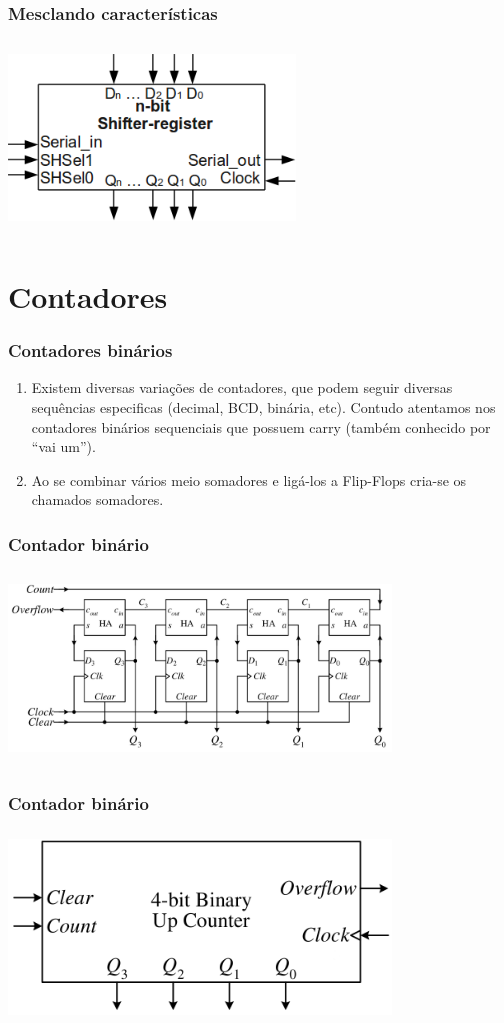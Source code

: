 \documentclass{beamer}
\begin{document}
\begin{frame}
  \frametitle{Mesclando características}
  \includegraphics[height=2in, width = 3in]{registrador_deslocamentoLR_entrada_paralela.png}
\end{frame}

\section{Contadores}
\begin{frame}
 \frametitle{Contadores binários}
  \begin{enumerate}
   \item Existem diversas variações de contadores, que podem seguir diversas sequências especificas (decimal, BCD, binária, etc). Contudo atentamos nos 
	 contadores binários sequenciais que possuem carry (também conhecido por “vai um”).\pause
   \item Ao se combinar vários meio somadores e ligá-los a Flip-Flops cria-se os chamados somadores.
  \end{enumerate}
\end{frame}

\begin{frame}
  \frametitle{Contador binário}
  \includegraphics[height=2in, width=4in]{contador.png}
\end{frame}

\begin{frame}
 \frametitle{Contador binário}
 \includegraphics[height=2in, width=4in]{contador_simbolo.png}
\end{frame}
\end{document}
